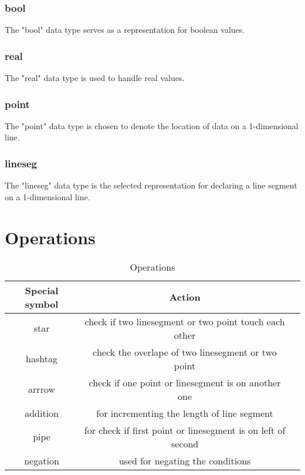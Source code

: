 \documentclass{article}
\begin{document}
\subsubsection{bool}
\begin{description}[leftmargin=1cm]
  \item[Usage:] The "bool" data type serves as a representation for boolean values.
\end{description}

\subsubsection{real}
\begin{description}[leftmargin=1cm]
  \item[Usage:] The "real" data type is used to handle real values.
\end{description}

\subsubsection{point}
\begin{description}[leftmargin=1cm]
  \item[Usage:] The "point" data type is chosen to denote the location of data on a 1-dimensional line.
\end{description}

\subsubsection{lineseg}
\begin{description}[leftmargin=1cm]
  \item[Usage:] The "lineseg" data type is the selected representation for declaring a line segment on a 1-dimensional line.
\end{description}

\section{Operations}
\begin{table}[h!]
  \centering
  \caption{Operations}
  \label{tab:Operations}
  \begin{tabular}{|c|c|c|}
  \hline
  Special symbol & Action  \\
  \hline
  star &  check if  two linesegment or two point touch each other \\
  hashtag & check the overlape of two linesegment or two point  \\
  arrrow &  check if one point or linesegment is on another one\\
  addition & for incrementing the length of line segment \\
  pipe & for check if first point or linesegment is on left of second \\
  negation & used for negating the conditions\\
  \hline
  \end{tabular}
  \end{table}
\end{document}
